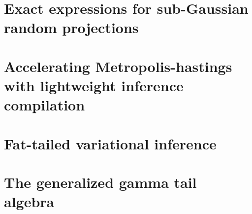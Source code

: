 \documentclass[oldfontcommands]{ucbthesis}
\begin{document}
\chapter{Exact expressions for sub-Gaussian random projections}



\chapter{Accelerating Metropolis-hastings with lightweight inference compilation}


\chapter{Fat-tailed variational inference}


\chapter{The generalized gamma tail algebra}

\end{document}
